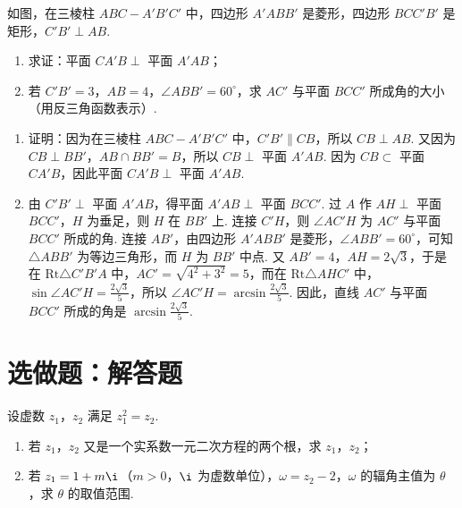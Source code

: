 \begin{problem}
如图，在三棱柱 \(ABC-A'B'C'\) 中，四边形 \(A'ABB'\) 是菱形，四边形 \(BCC'B'\) 是矩形，\(C'B' \perp AB\).
\begin{enumerate}
\item 求证：平面 \(CA'B \perp\) 平面 \(A'AB\)；
\item 若 \(C'B'=3\)，\(AB=4\)，\(\angle ABB'=60^\circ\)，求 \(AC'\) 与平面 \(BCC'\) 所成角的大小（用反三角函数表示）.
\end{enumerate}

\end{problem}

\begin{solution}

\begin{enumerate}
\item 证明：因为在三棱柱 \(ABC-A'B'C'\) 中，\(C'B' \parallel CB\)，所以 \(CB \perp AB\). 又因为 \(CB \perp BB'\)，\(AB \cap BB'=B\)，所以 \(CB \perp\) 平面 \(A'AB\). 因为 \(CB \subset\) 平面 \(CA'B\)，因此平面 \(CA'B \perp\) 平面 \(A'AB\).

\item 由 \(C'B' \perp\) 平面 \(A'AB\)，得平面 \(A'AB \perp\) 平面 \(BCC'\). 过 \(A\) 作 \(AH \perp\) 平面 \(BCC'\)，\(H\) 为垂足，则 \(H\) 在 \(BB'\) 上. 连接 \(C'H\)，则 \(\angle AC'H\) 为 \(AC'\) 与平面 \(BCC'\) 所成的角. 连接 \(AB'\)，由四边形 \(A'ABB'\) 是菱形，\(\angle ABB'=60^\circ\)，可知 \(\triangle ABB'\) 为等边三角形，而 \(H\) 为 \(BB'\) 中点. 又 \(AB'=4\)，\(AH=2\sqrt{3}\)，于是在 \(\mathrm{Rt}\triangle C'B'A\) 中，\(AC'=\sqrt{4^2+3^2}=5\)，而在 \(\mathrm{Rt}\triangle AHC'\) 中，\(\sin \angle AC'H=\frac{2\sqrt{3}}{5}\)，所以 \(\angle AC'H=\arcsin \frac{2\sqrt{3}}{5}\). 因此，直线 \(AC'\) 与平面 \(BCC'\) 所成的角是 \(\arcsin \frac{2\sqrt{3}}{5}\).
\end{enumerate}
\end{solution}


\section{选做题：解答题}

\begin{problem}[A]
设虚数 \(z_1\)，\(z_2\) 满足 \(z_1^2=z_2\).
\begin{enumerate}
\item 若 \(z_1\)，\(z_2\) 又是一个实系数一元二次方程的两个根，求 \(z_1\)，\(z_2\)；
\item 若 \(z_1=1+m\i\)（\(m>0\)，\(\i\) 为虚数单位），\(\omega=z_2-2\)，\(\omega\) 的辐角主值为 \(\theta\)，求 \(\theta\) 的取值范围.
\end{enumerate}
\end{problem}

